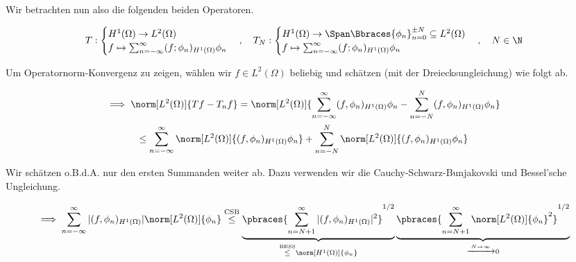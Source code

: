 \begin{solution}
\begin{enumerate}[label = \textbf{\alph*)}]
  Wir betrachten nun also die folgenden beiden Operatoren.

  \begin{align*}
    T:
    \begin{cases}
      H^1(\Omega) \to L^2(\Omega) \\
      f
      \mapsto
      \sum_{n = -\infty}^\infty
      (f; \phi_n)_{H^1(\Omega)} \phi_n
    \end{cases},
    \quad
    T_N:
    \begin{cases}
      H^1(\Omega)
      \to
      \Span
      \Bbraces{\phi_n}_{n = 0}^{\pm N}
      \subseteq
      L^2(\Omega) \\
      f
      \mapsto
      \sum_{n = -\infty}^\infty
      (f; \phi_n)_{H^1(\Omega)} \phi_n
    \end{cases},
    \quad
    N \in \N
  \end{align*}

  Um Operatornorm-Konvergenz zu zeigen, wählen wir $f \in L^2(\Omega)$ beliebig und schätzen (mit der Dreiecksungleichung) wie folgt ab.

  \begin{multline*}
    \implies
    \norm[L^2(\Omega)]{T f - T_n f}
    =
    \norm[L^2(\Omega)]
    {
      \sum_{n = -\infty}^\infty
      (f, \phi_n)_{H^1(\Omega)} \phi_n
      -
      \sum_{n = -N}^N
      (f, \phi_n)_{H^1(\Omega)} \phi_n
    } \\
    \leq
    \sum_{n = -\infty}^\infty
    \norm[L^2(\Omega)]
    {
      (f, \phi_n)_{H^1(\Omega)}
      \phi_n
    }
    +
    \sum_{n = -N}^N
    \norm[L^2(\Omega)]
    {
      (f, \phi_n)_{H^1(\Omega)}
      \phi_n
    }
  \end{multline*}

  Wir schätzen o.B.d.A. nur den ersten Summanden weiter ab.
  Dazu verwenden wir die Cauchy-Schwarz-Bunjakovski und Bessel'sche Ungleichung.


  \begin{align*}
    \implies
    \sum_{n = -\infty}^\infty
    |(f, \phi_n)_{H^1(\Omega)}|
    \norm[L^2(\Omega)]{\phi_n}
    \stackrel
    {
      \text{CSB}
    }
    {\leq}
    \underbrace
    {
      \pbraces
      {
        \sum_{n=N+1}^\infty
        |(f, \phi_n)_{H^1(\Omega)}|^2
      }^{1/2}
    }_{
      \stackrel
      {
        \text{BESS}
      }{\leq}
      \norm[H^1(\Omega)]{\phi_n}
    }
    \underbrace
    {
      \pbraces
      {
        \sum_{n=N+1}^\infty
        \norm[L^2(\Omega)]{\phi_n}^2
      }^{1/2}
    }_{
      \xrightarrow{N \to \infty} 0
    }
  \end{align*}


\end{enumerate}
\end{solution}
